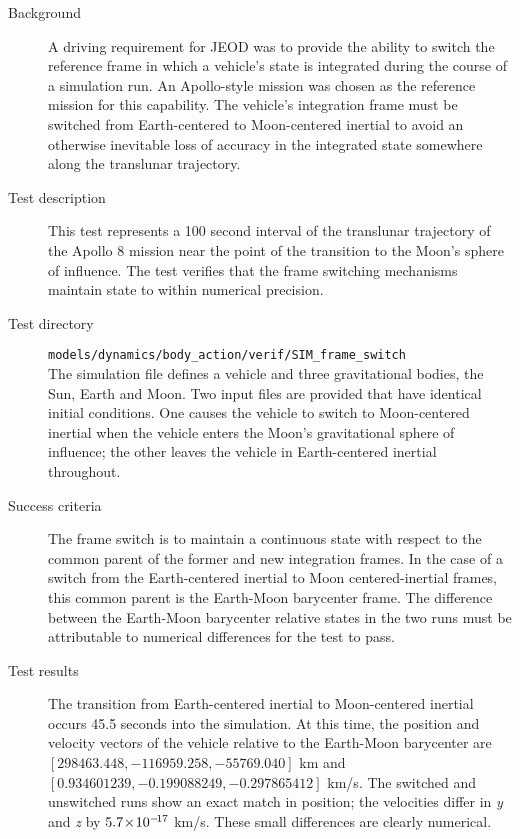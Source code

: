 \label{test:frame_switch}
\begin{description}
\item[Background]
A driving requirement for JEOD was to provide the ability to switch the
reference frame in which a vehicle's state is integrated during the course of a
simulation run. An Apollo-style mission was chosen as the reference mission for
this capability. The vehicle's integration frame must be switched from
Earth-centered to Moon-centered inertial to avoid an otherwise inevitable loss of
accuracy in the integrated state somewhere along the translunar trajectory.

\item[Test description]
This test represents a 100 second interval of the translunar trajectory of the
Apollo 8 mission near the point of the transition to the Moon's sphere of
influence. The test verifies that the frame switching mechanisms maintain state
to within numerical precision.

\item[Test directory]
{\tt models/dynamics/body\_action/verif/SIM\_frame\_switch} \\
The simulation \Sdefine file defines a vehicle and three gravitational bodies,
the Sun, Earth and Moon. Two input files are provided that
have identical initial conditions. One 
causes the vehicle to switch to Moon-centered inertial
when the vehicle enters the Moon's gravitational sphere of influence;
the other leaves the vehicle in Earth-centered inertial throughout.

\item[Success criteria]
The frame switch is to maintain a continuous state with respect to the common
parent of the former and new integration frames. In the case of a switch from
the Earth-centered inertial to Moon centered-inertial frames, this common
parent is the Earth-Moon barycenter frame. The difference between the Earth-Moon
barycenter relative states in the two runs must be attributable to numerical
differences for the test to pass.

\item[Test results]
The transition from Earth-centered inertial to Moon-centered inertial occurs 45.5
seconds into the simulation. At this time, the position and velocity vectors of
the vehicle relative to the Earth-Moon barycenter are
$[298463.448, -116959.258, -55769.040]$ km and
$[0.934601239, -0.199088249, -0.297865412]$ km/s.
The switched and unswitched runs show an exact match in position;
the velocities differ in {\emph y} and {\emph z} by $5.7\!\times\! 10^{-\!17}$ km/s.
These small differences are clearly numerical.


\end{description}
